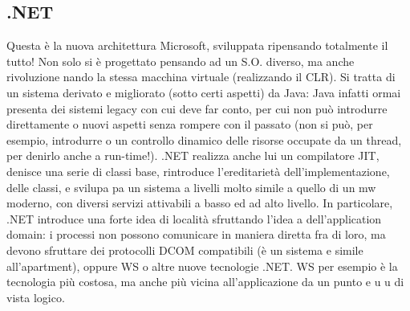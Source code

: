 \documentclass[a4paper,12pt]{article}
\begin{document}
\subsection{.NET}
Questa è la nuova architettura Microsoft, sviluppata ripensando totalmente il tutto! Non solo si è progettato pensando
ad un S.O. diverso, ma anche rivoluzione 
nando la stessa macchina virtuale (realizzando il CLR). Si tratta di un sistema
derivato e migliorato (sotto certi aspetti) da Java: Java infatti ormai presenta
dei sistemi legacy con cui deve far conto, per cui non può introdurre direttamente
o
nuovi aspetti senza rompere con il passato (non si può, per esempio, introdurre
o
un controllo dinamico delle risorse occupate da un thread, per denirlo anche a
run-time!). .NET realizza anche lui un compilatore JIT, denisce una serie di
classi base, rintroduce l'ereditarietà dell'implementazione, delle classi, e svilupa
pa un sistema a livelli molto simile a quello di un mw moderno, con diversi
servizi attivabili a basso ed ad alto livello.
In particolare, .NET introduce una forte idea di località sfruttando l'idea
a
dell'application domain: i processi non possono comunicare in maniera diretta
fra di loro, ma devono sfruttare dei protocolli DCOM compatibili (è un sistema
e
simile all'apartment), oppure WS o altre nuove tecnologie .NET. WS per esempio è la tecnologia più costosa, ma anche più
vicina all'applicazione da un punto
e
u
u
di vista logico.
\end{document}
